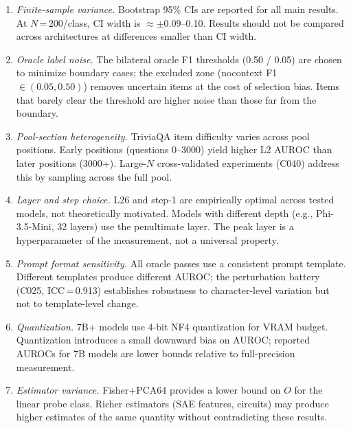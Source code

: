 \documentclass[11pt]{article}
\begin{document}
\begin{enumerate}[leftmargin=2em, label=\textbf{E\arabic*.}]
\item \emph{Finite-sample variance.} Bootstrap 95\% CIs are reported for all main
  results. At $N$\,=\,200/class, CI width is $\approx\pm0.09$--0.10. Results should
  not be compared across architectures at differences smaller than CI width.

\item \emph{Oracle label noise.} The bilateral oracle F1 thresholds (0.50 / 0.05)
  are chosen to minimize boundary cases; the excluded zone (nocontext F1 $\in (0.05,
  0.50)$) removes uncertain items at the cost of selection bias. Items that barely
  clear the threshold are higher noise than those far from the boundary.

\item \emph{Pool-section heterogeneity.} TriviaQA item difficulty varies across pool
  positions. Early positions (questions 0--3000) yield higher L2 AUROC than later
  positions (3000+). Large-$N$ cross-validated experiments (C040) address this by
  sampling across the full pool.

\item \emph{Layer and step choice.} L26 and step-1 are empirically optimal across
  tested models, not theoretically motivated. Models with different depth
  (e.g., Phi-3.5-Mini, 32 layers) use the penultimate layer. The peak layer is a
  hyperparameter of the measurement, not a universal property.

\item \emph{Prompt format sensitivity.} All oracle passes use a consistent prompt
  template. Different templates produce different AUROC; the perturbation battery
  (C025, ICC\,=\,0.913) establishes robustness to character-level variation but
  not to template-level change.

\item \emph{Quantization.} 7B+ models use 4-bit NF4 quantization for VRAM budget.
  Quantization introduces a small downward bias on AUROC; reported AUROCs for 7B
  models are lower bounds relative to full-precision measurement.

\item \emph{Estimator variance.} Fisher+PCA64 provides a lower bound on $O$ for
  the linear probe class. Richer estimators (SAE features, circuits) may produce
  higher estimates of the same quantity without contradicting these results.
\end{enumerate}
\end{document}
